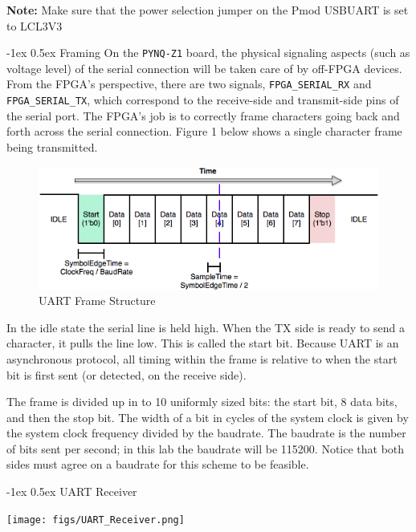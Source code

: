 \documentclass[11pt]{article}
\makeatletter
\renewcommand{\subsection}
{\@startsection {subsection}{1}{0pt}
 {-1ex}
 {0.5ex}
 {\bfseries\normalsize}}
\makeatother
\begin{document}
\textbf{Note:} Make sure that the power selection jumper on the Pmod USBUART is set to LCL3V3

\subsection{Framing}
On the \verb|PYNQ-Z1| board, the physical signaling aspects (such as voltage level) of the serial connection will be taken care of by off-FPGA devices.
From the FPGA's perspective, there are two signals, \verb|FPGA_SERIAL_RX| and \verb|FPGA_SERIAL_TX|, which correspond to the receive-side and transmit-side pins of the serial port.
The FPGA's job is to correctly frame characters going back and forth across the serial connection.
Figure 1 below shows a single character frame being transmitted.

\begin{figure}[H]
  \centerline{\includegraphics[width=6in]{figs/uart_frame.png}}
  \caption{UART Frame Structure}
\end{figure}

In the idle state the serial line is held high.
When the TX side is ready to send a character, it pulls the line low.
This is called the start bit.
Because UART is an asynchronous protocol, all timing within the frame is relative to when the start bit is first sent (or detected, on the receive side).

The frame is divided up in to 10 uniformly sized bits: the start bit, 8 data bits, and then the stop bit.
The width of a bit in cycles of the system clock is given by the system clock frequency divided by the baudrate.
The baudrate is the number of bits sent per second; in this lab the baudrate will be 115200.
Notice that both sides must agree on a baudrate for this scheme to be feasible.

\subsection{UART Receiver}

\begin{center}
\texttt{[image: figs/UART\_Receiver.png]}
\end{center}
\end{document}

